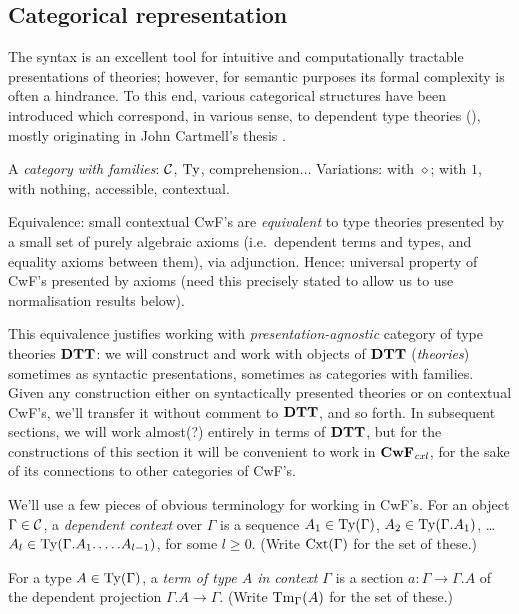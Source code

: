 \documentclass{amsart}
\begin{document}
\subsection{Categorical representation}

The syntax is an excellent tool for intuitive and computationally tractable presentations of theories; however, for semantic purposes its formal complexity is often a hindrance.  To this end, various categorical structures have been introduced which correspond, in various sense, to dependent type theories (\todo{[citations!]}), mostly originating in John Cartmell's thesis \cite{cartmell-thesis}.  

\begin{definition}A \emph{category with families}: $\mathcal{C}$, $\mathrm{Ty}$, comprehension$\ldots$  Variations: with $\diamond$; with $1$, with nothing, accessible, contextual.
\end{definition}

\begin{proposition} \label{prop:cwf-equivalence} Equivalence: small contextual CwF's are \emph{equivalent} to type theories presented by a small set of purely algebraic axioms (i.e.\ dependent terms and types, and equality axioms between them), via adjunction.  Hence: universal property of CwF's presented by axioms (need this precisely stated to allow us to use normalisation results below).
\end{proposition}

This equivalence justifies working with \emph{presentation-agnostic} category of type theories $\mathbf{DTT}$: we will construct and work with objects of $\mathbf{DTT}$ (\emph{theories}) sometimes as syntactic presentations, sometimes as categories with families.  Given any construction either on syntactically presented theories or on contextual CwF's, we'll transfer it without comment to $\mathbf{DTT}$, and so forth.  In subsequent sections, we will work almost(?) entirely in terms of $\mathbf{DTT}$, but for the constructions of this section it will be convenient to work in $\mathbf{CwF}_{\mathit{cxl}}$, for the sake of its connections to other categories of CwF's.

\begin{para} We'll use a few pieces of obvious terminology for working in CwF's.  For an object $\Gamma \in \mathcal{C}$, a \emph{dependent context} over $\Gamma$ is a sequence $A_1 \in \mathrm{Ty}(\Gamma)$, $A_2 \in \mathrm{Ty}(\Gamma.A_1)$, \ldots $A_l \in \mathrm{Ty}(\Gamma.A_1.\ldots.A_{l-1})$, for some $l \geq 0$.  (Write $\mathrm{Cxt}(\Gamma)$ for the set of these.)

For a type $A \in \mathrm{Ty}(\Gamma)$, a \emph{term of type $A$ in context $\Gamma$} is a section $a : \Gamma \to \Gamma.A$ of the dependent projection $\Gamma.A \to \Gamma$.  (Write $\mathrm{Tm}_\Gamma(A)$ for the set of these.)
\end{para}
\end{document}
